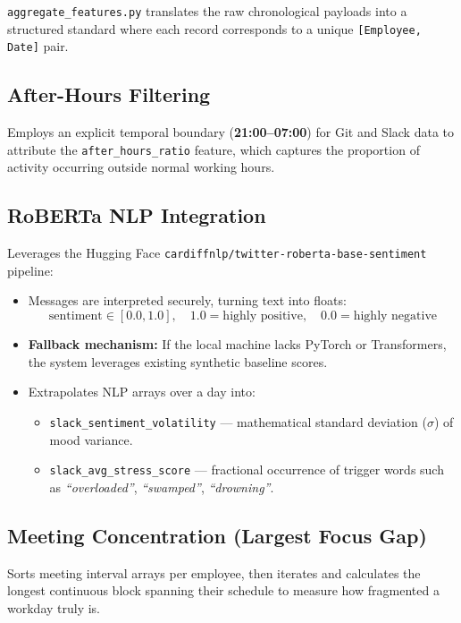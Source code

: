 \documentclass[12pt, a4paper, oneside]{report}
\begin{document}
\texttt{aggregate\_features.py} translates the raw chronological payloads into a structured standard where each record corresponds to a unique \texttt{[Employee, Date]} pair.

\subsection{After-Hours Filtering}

Employs an explicit temporal boundary (\textbf{21:00--07:00}) for Git and Slack data to attribute the \texttt{after\_hours\_ratio} feature, which captures the proportion of activity occurring outside normal working hours.

\subsection{RoBERTa NLP Integration}

Leverages the Hugging Face \texttt{cardiffnlp/twitter-roberta-base-sentiment} pipeline:

\begin{itemize}
    \item Messages are interpreted securely, turning text into floats:
    \[
        \text{sentiment} \in [0.0, 1.0], \quad 1.0 = \text{highly positive}, \quad 0.0 = \text{highly negative}
    \]

    \item \textbf{Fallback mechanism:} If the local machine lacks PyTorch or Transformers, the system leverages existing synthetic baseline scores.

    \item Extrapolates NLP arrays over a day into:
    \begin{itemize}
        \item \texttt{slack\_sentiment\_volatility} --- mathematical standard deviation ($\sigma$) of mood variance.
        \item \texttt{slack\_avg\_stress\_score} --- fractional occurrence of trigger words such as \emph{``overloaded''}, \emph{``swamped''}, \emph{``drowning''}.
    \end{itemize}
\end{itemize}

\subsection{Meeting Concentration (Largest Focus Gap)}

Sorts meeting interval arrays per employee, then iterates and calculates the longest continuous block spanning their schedule to measure how fragmented a workday truly is.
\end{document}
